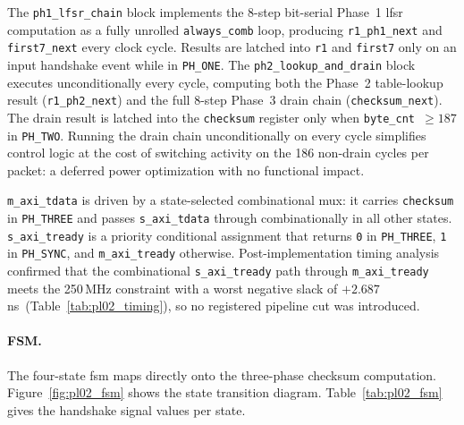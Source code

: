 The \texttt{ph1\_lfsr\_chain} block implements the 8-step bit-serial
Phase~1 \ac{lfsr} computation as a fully unrolled \texttt{always\_comb}
loop, producing \texttt{r1\_ph1\_next} and \texttt{first7\_next} every
clock cycle.
Results are latched into \texttt{r1} and \texttt{first7} only on an
input handshake event while in \texttt{PH\_ONE}.
The \texttt{ph2\_lookup\_and\_drain} block executes unconditionally every
cycle, computing both the Phase~2 table-lookup result
(\texttt{r1\_ph2\_next}) and the full 8-step Phase~3 drain chain
(\texttt{checksum\_next}).
The drain result is latched into the \texttt{checksum} register only when
\texttt{byte\_cnt}~$\geq 187$ in \texttt{PH\_TWO}.
Running the drain chain unconditionally on every cycle simplifies control
logic at the cost of switching activity on the 186 non-drain cycles per
packet: a deferred power optimization with no functional impact.

\texttt{m\_axi\_tdata} is driven by a state-selected combinational mux:
it carries \texttt{checksum} in \texttt{PH\_THREE} and passes
\texttt{s\_axi\_tdata} through combinationally in all other states.
\texttt{s\_axi\_tready} is a priority conditional assignment that returns
\texttt{0} in \texttt{PH\_THREE}, \texttt{1} in \texttt{PH\_SYNC}, and
\texttt{m\_axi\_tready} otherwise.
Post-implementation timing analysis confirmed that the combinational
\texttt{s\_axi\_tready} path through \texttt{m\_axi\_tready} meets the
250\,MHz constraint with a worst negative slack of
$+2.687$\,ns~(Table~\ref{tab:pl02_timing}), so no registered pipeline
cut was introduced.


\FloatBarrier
\paragraph{FSM.}
The four-state \ac{fsm} maps directly onto the three-phase checksum
computation.
Figure~\ref{fig:pl02_fsm} shows the state transition diagram.
Table~\ref{tab:pl02_fsm} gives the handshake signal values per state.

